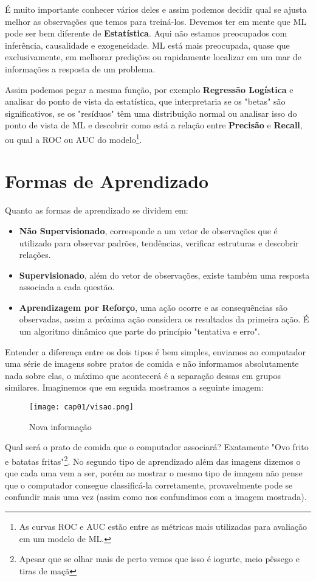 É muito importante conhecer vários deles e assim podemos decidir qual se ajusta melhor as observações que temos para treiná-los. Devemos ter em mente que ML pode ser bem diferente de \textbf{Estatística}. Aqui não estamos preocupados com inferência, causalidade e exogeneidade. ML está mais preocupada, quase que exclusivamente, em melhorar predições ou rapidamente localizar em um mar de informações a resposta de um problema. 

Assim podemos pegar a mesma função, por exemplo \textbf{Regressão Logística} e analisar do ponto de vista da estatística, que interpretaria se os "betas" são significativos, se os "resíduos" têm uma distribuição normal ou analisar isso do ponto de vista de ML e descobrir como está a relação entre \textbf{Precisão} e \textbf{Recall}, ou qual a ROC ou AUC do modelo\footnote{As curvas ROC e AUC estão entre as métricas mais utilizadas para avaliação em um modelo de ML.}.

\section{Formas de Aprendizado}
Quanto as formas de aprendizado se dividem em:
\begin{itemize}[noitemsep]
	\item \textbf{Não Supervisionado}, corresponde a um vetor de observações que é utilizado para observar padrões, tendências, verificar estruturas e descobrir relações.
	\item \textbf{Supervisionado}, além do vetor de observações, existe também uma resposta associada a cada questão.
	\item \textbf{Aprendizagem por Reforço}, uma ação ocorre e as consequências são observadas, assim a próxima ação considera os resultados da primeira ação. É um algoritmo dinâmico que parte do princípio "tentativa e erro".
\end{itemize}

Entender a diferença entre os dois tipos é bem simples, enviamos ao computador uma série de imagens sobre pratos de comida e não informamos absolutamente nada sobre elas, o máximo que acontecerá é a separação dessas em grupos similares. Imaginemos que em seguida mostramos a seguinte imagem:
\begin{figure}[H]
	\centering\texttt{[image: cap01/visao.png]}
	\caption{Nova informação}
\end{figure}

Qual será o prato de comida que o computador associará? Exatamente "Ovo frito e batatas fritas"\footnote{Apesar que se olhar mais de perto vemos que isso é iogurte, meio pêssego e tiras de maçã}. No segundo tipo de aprendizado além das imagens dizemos o que cada uma vem a ser, porém ao mostrar o mesmo tipo de imagem não pense que o computador consegue classificá-la corretamente, provavelmente pode se confundir mais uma vez (assim como nos confundimos com a imagem mostrada).

